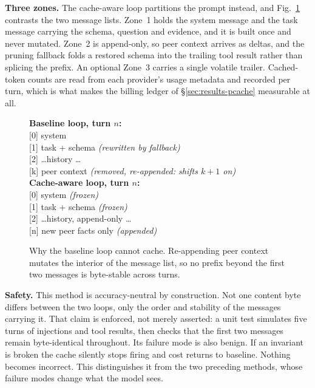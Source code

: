 \documentclass[conference]{IEEEtran}
\begin{document}
\textbf{Three zones.} The cache-aware loop partitions the prompt instead, and
Fig.~\ref{fig:zones} contrasts the two message lists. Zone~1 holds the system
message and the task message carrying the schema, question and evidence, and it
is built once and never mutated. Zone~2 is append-only, so peer context arrives as
deltas, and the pruning fallback folds a restored schema into the trailing tool
result rather than splicing the prefix. An optional Zone~3 carries a single
volatile trailer. Cached-token counts are read from each provider's usage
metadata and recorded per turn, which is what makes the billing ledger of
§\ref{sec:results-pcache} measurable at all.

\begin{figure}[t]
\footnotesize\ttfamily\raggedright
\textbf{\rmfamily Baseline loop, turn $n$:}\\
{[}0{]} system\\
{[}1{]} task + schema \quad\textrm{\itshape (rewritten by fallback)}\\
{[}2{]} \ldots history \ldots\\
{[}k{]} peer context \quad\textrm{\itshape (removed, re-appended: shifts $k{+}1$ on)}\\[4pt]
\textbf{\rmfamily Cache-aware loop, turn $n$:}\\
{[}0{]} system \quad\textrm{\itshape (frozen)}\\
{[}1{]} task + schema \quad\textrm{\itshape (frozen)}\\
{[}2{]} \ldots history, append-only \ldots\\
{[}n{]} new peer facts only \quad\textrm{\itshape (appended)}
\normalfont\rmfamily
\caption{Why the baseline loop cannot cache. Re-appending peer context mutates
the interior of the message list, so no prefix beyond the first two messages is
byte-stable across turns.}
\label{fig:zones}
\end{figure}

\textbf{Safety.} This method is accuracy-neutral by construction. Not one
content byte differs between the two loops, only the order and stability of the
messages carrying it. That claim is enforced, not merely asserted: a unit test
simulates five turns of injections and tool results, then checks that the first
two messages remain byte-identical throughout. Its failure mode is also
benign. If an invariant is broken the cache silently stops firing and cost
returns to baseline. Nothing becomes incorrect. This distinguishes it from the
two preceding methods, whose failure modes change what the model sees.
\end{document}
